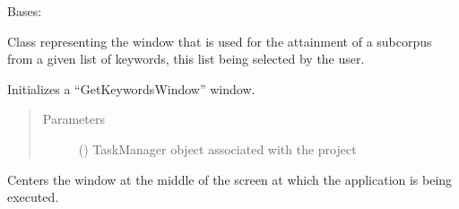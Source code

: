 \documentclass[letterpaper,10pt,english]{sphinxmanual}
\begin{document}
\begin{fulllineitems}
\label{\detokenize{gui_get_keywords_window:src.graphical_user_interface.get_keywords_window.GetKeywordsWindow}}
\sphinxAtStartPar
Bases: 

\sphinxAtStartPar
Class representing the window that is used for the attainment of a subcorpus
from a given list of keywords, this list being selected by the user.

\begin{fulllineitems}
\label{\detokenize{gui_get_keywords_window:src.graphical_user_interface.get_keywords_window.GetKeywordsWindow.__init__}}
\sphinxAtStartPar
Initializes a “GetKeywordsWindow” window.
\begin{quote}\begin{description}
\item[{Parameters}] \leavevmode
\sphinxAtStartPar
{} () \textendash{} TaskManager object associated with the project

\end{description}\end{quote}

\end{fulllineitems}


\begin{fulllineitems}
\label{\detokenize{gui_get_keywords_window:src.graphical_user_interface.get_keywords_window.GetKeywordsWindow.center}}
\sphinxAtStartPar
Centers the window at the middle of the screen at which the application is being executed.

\end{fulllineitems}


\end{fulllineitems}
\end{document}

